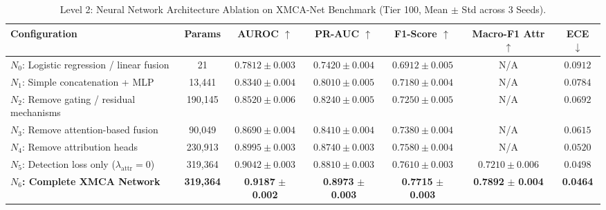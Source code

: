 \begin{table}[t]
\centering
\small
\caption{Level 2: Neural Network Architecture Ablation on XMCA-Net Benchmark (Tier 100, Mean $\pm$ Std across 3 Seeds).}
\label{tab:ablation_level2_architecture}
\begin{tabular}{lcccccc}
\toprule
\textbf{Configuration} & \textbf{Params} & \textbf{AUROC} $\uparrow$ & \textbf{PR-AUC} $\uparrow$ & \textbf{F1-Score} $\uparrow$ & \textbf{Macro-F1 Attr} $\uparrow$ & \textbf{ECE} $\downarrow$ \\
\midrule
$N_0$: Logistic regression / linear fusion & 21 & $0.7812 \pm 0.003$ & $0.7420 \pm 0.004$ & $0.6912 \pm 0.005$ & N/A & $0.0912$ \\
$N_1$: Simple concatenation + MLP & 13,441 & $0.8340 \pm 0.004$ & $0.8010 \pm 0.005$ & $0.7180 \pm 0.004$ & N/A & $0.0784$ \\
$N_2$: Remove gating / residual mechanisms & 190,145 & $0.8520 \pm 0.006$ & $0.8240 \pm 0.005$ & $0.7250 \pm 0.005$ & N/A & $0.0692$ \\
$N_3$: Remove attention-based fusion & 90,049 & $0.8690 \pm 0.004$ & $0.8410 \pm 0.004$ & $0.7380 \pm 0.004$ & N/A & $0.0615$ \\
$N_4$: Remove attribution heads & 230,913 & $0.8995 \pm 0.003$ & $0.8740 \pm 0.003$ & $0.7580 \pm 0.004$ & N/A & $0.0520$ \\
$N_5$: Detection loss only ($\lambda_{\text{attr}}=0$) & 319,364 & $0.9042 \pm 0.003$ & $0.8810 \pm 0.003$ & $0.7610 \pm 0.003$ & $0.7210 \pm 0.006$ & $0.0498$ \\
\textbf{$N_6$: Complete XMCA Network} & \textbf{319,364} & \textbf{0.9187} $\pm$ \textbf{0.002} & \textbf{0.8973} $\pm$ \textbf{0.003} & \textbf{0.7715} $\pm$ \textbf{0.003} & \textbf{0.7892} $\pm$ \textbf{0.004} & \textbf{0.0464} \\
\bottomrule
\end{tabular}
\end{table}